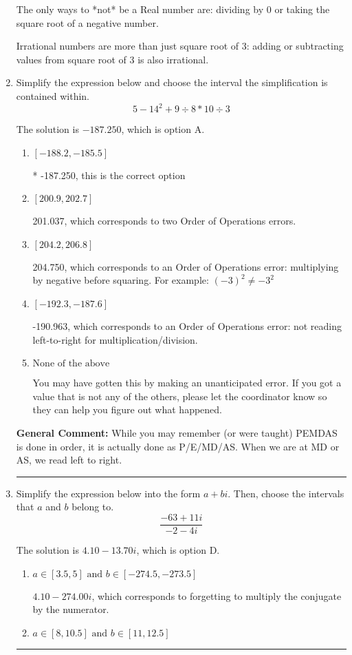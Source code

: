 \documentclass{extbook}[14pt]
\newcommand{\litem}[1]{\item #1

\rule{\textwidth}{0.4pt}}
\begin{document}
\begin{enumerate}
{ The only ways to *not* be a Real number are: dividing by 0 or taking the square root of a negative number. 
 
 Irrational numbers are more than just square root of 3: adding or subtracting values from square root of 3 is also irrational.
}
\litem{
Simplify the expression below and choose the interval the simplification is contained within.
\[ 5 - 14^2 + 9 \div 8 * 10 \div 3 \]

The solution is \( -187.250 \), which is option A.\begin{enumerate}[label=\Alph*.]
\item \( [-188.2, -185.5] \)

* -187.250, this is the correct option
\item \( [200.9, 202.7] \)

 201.037, which corresponds to two Order of Operations errors.
\item \( [204.2, 206.8] \)

 204.750, which corresponds to an Order of Operations error: multiplying by negative before squaring. For example: $(-3)^2 \neq -3^2$
\item \( [-192.3, -187.6] \)

 -190.963, which corresponds to an Order of Operations error: not reading left-to-right for multiplication/division.
\item \( \text{None of the above} \)

 You may have gotten this by making an unanticipated error. If you got a value that is not any of the others, please let the coordinator know so they can help you figure out what happened.
\end{enumerate}

\textbf{General Comment:} While you may remember (or were taught) PEMDAS is done in order, it is actually done as P/E/MD/AS. When we are at MD or AS, we read left to right.
}
\litem{
Simplify the expression below into the form $a+bi$. Then, choose the intervals that $a$ and $b$ belong to.
\[ \frac{-63 + 11 i}{-2 - 4 i} \]

The solution is \( 4.10  - 13.70 i \), which is option D.\begin{enumerate}[label=\Alph*.]
\item \( a \in [3.5, 5] \text{ and } b \in [-274.5, -273.5] \)

 $4.10  - 274.00 i$, which corresponds to forgetting to multiply the conjugate by the numerator.
\item \( a \in [8, 10.5] \text{ and } b \in [11, 12.5] \)


\end{enumerate}}
\end{enumerate}
\end{document}
